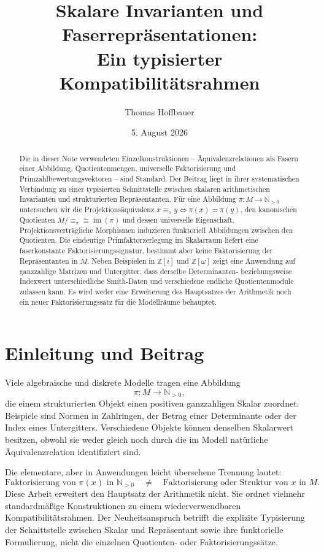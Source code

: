 \documentclass[11pt,a4paper,reqno]{amsart}
\title[Skalare Invarianten und Faserrepräsentationen]{Skalare Invarianten und Faserrepräsentationen:\\Ein typisierter Kompatibilitätsrahmen}
\author{Thomas Hoffbauer}
\date{5. August 2026}
\theoremstyle{definition}
\theoremstyle{remark}
\newcommand{\Npos}{\mathbb{N}_{>0}}
\newcommand{\Z}{\mathbb{Z}}
\newcommand{\im}{\operatorname{im}}
\newcommand{\eqpi}{\mathrel{\equiv_{\pi}}}
\begin{document}
\begin{abstract}
Die in dieser Note verwendeten Einzelkonstruktionen -- Äquivalenzrelationen als Fasern einer Abbildung, Quotientenmengen, universelle Faktorisierung und Primzahlbewertungsvektoren -- sind Standard. Der Beitrag liegt in ihrer systematischen Verbindung zu einer typisierten Schnittstelle zwischen skalaren arithmetischen Invarianten und strukturierten Repräsentanten. Für eine Abbildung $\pi\colon M\to\Npos$ untersuchen wir die Projektionsäquivalenz $x\eqpi y\iff\pi(x)=\pi(y)$, den kanonischen Quotienten $M/{\equiv_\pi}\cong\im(\pi)$ und dessen universelle Eigenschaft. Projektionsverträgliche Morphismen induzieren funktoriell Abbildungen zwischen den Quotienten. Die eindeutige Primfaktorzerlegung im Skalarraum liefert eine faserkonstante Faktorisierungssignatur, bestimmt aber keine Faktorisierung der Repräsentanten in $M$. Neben Beispielen in $\Z[i]$ und $\Z[\omega]$ zeigt eine Anwendung auf ganzzahlige Matrizen und Untergitter, dass derselbe Determinanten- beziehungsweise Indexwert unterschiedliche Smith-Daten und verschiedene endliche Quotientenmodule zulassen kann. Es wird weder eine Erweiterung des Hauptsatzes der Arithmetik noch ein neuer Faktorisierungssatz für die Modellräume behauptet.
\end{abstract}

\maketitle

\section{Einleitung und Beitrag}

Viele algebraische und diskrete Modelle tragen eine Abbildung
\[
  \pi\colon M\longrightarrow\Npos,
\]
die einem strukturierten Objekt einen positiven ganzzahligen Skalar zuordnet. Beispiele sind Normen in Zahlringen, der Betrag einer Determinante oder der Index eines Untergitters. Verschiedene Objekte können denselben Skalarwert besitzen, obwohl sie weder gleich noch durch die im Modell natürliche Äquivalenzrelation identifiziert sind.

Die elementare, aber in Anwendungen leicht übersehene Trennung lautet:
\[
  \text{Faktorisierung von }\pi(x)\text{ in }\Npos
  \quad\neq\quad
  \text{Faktorisierung oder Struktur von }x\text{ in }M.
\]
Diese Arbeit erweitert den Hauptsatz der Arithmetik nicht. Sie ordnet vielmehr standardmäßige Konstruktionen zu einem wiederverwendbaren Kompatibilitätsrahmen. Der Neuheitsanspruch betrifft die explizite Typisierung der Schnittstelle zwischen Skalar und Repräsentant sowie ihre funktorielle Formulierung, nicht die einzelnen Quotienten- oder Faktorisierungssätze.
\end{document}
